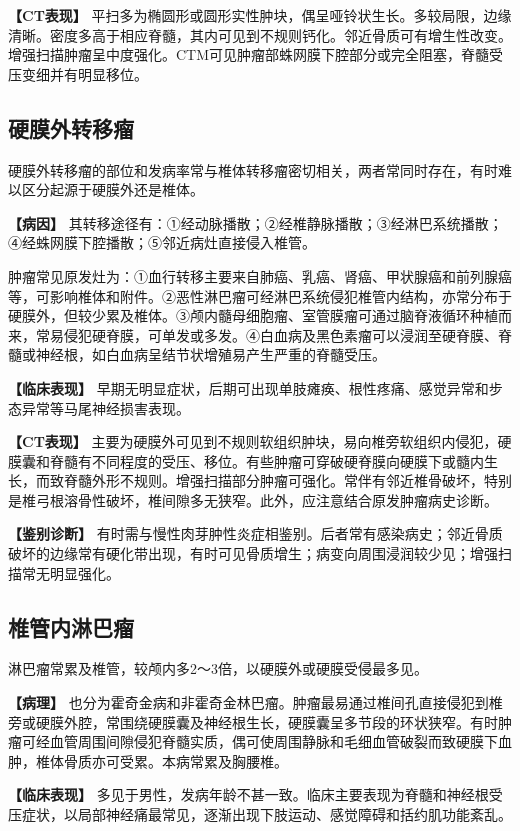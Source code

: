 \textbf{【CT表现】}
平扫多为椭圆形或圆形实性肿块，偶呈哑铃状生长。多较局限，边缘清晰。密度多高于相应脊髓，其内可见到不规则钙化。邻近骨质可有增生性改变。增强扫描肿瘤呈中度强化。CTM可见肿瘤部蛛网膜下腔部分或完全阻塞，脊髓受压变细并有明显移位。

\subsection{硬膜外转移瘤}

硬膜外转移瘤的部位和发病率常与椎体转移瘤密切相关，两者常同时存在，有时难以区分起源于硬膜外还是椎体。

\textbf{【病因】}
其转移途径有：①经动脉播散；②经椎静脉播散；③经淋巴系统播散；④经蛛网膜下腔播散；⑤邻近病灶直接侵入椎管。

肿瘤常见原发灶为：①血行转移主要来自肺癌、乳癌、肾癌、甲状腺癌和前列腺癌等，可影响椎体和附件。②恶性淋巴瘤可经淋巴系统侵犯椎管内结构，亦常分布于硬膜外，但较少累及椎体。③颅内髓母细胞瘤、室管膜瘤可通过脑脊液循环种植而来，常易侵犯硬脊膜，可单发或多发。④白血病及黑色素瘤可以浸润至硬脊膜、脊髓或神经根，如白血病呈结节状增殖易产生严重的脊髓受压。

\textbf{【临床表现】}
早期无明显症状，后期可出现单肢瘫痪、根性疼痛、感觉异常和步态异常等马尾神经损害表现。

\textbf{【CT表现】}
主要为硬膜外可见到不规则软组织肿块，易向椎旁软组织内侵犯，硬膜囊和脊髓有不同程度的受压、移位。有些肿瘤可穿破硬脊膜向硬膜下或髓内生长，而致脊髓外形不规则。增强扫描部分肿瘤可强化。常伴有邻近椎骨破坏，特别是椎弓根溶骨性破坏，椎间隙多无狭窄。此外，应注意结合原发肿瘤病史诊断。

\textbf{【鉴别诊断】}
有时需与慢性肉芽肿性炎症相鉴别。后者常有感染病史；邻近骨质破坏的边缘常有硬化带出现，有时可见骨质增生；病变向周围浸润较少见；增强扫描常无明显强化。

\subsection{椎管内淋巴瘤}

淋巴瘤常累及椎管，较颅内多2～3倍，以硬膜外或硬膜受侵最多见。

\textbf{【病理】}
也分为霍奇金病和非霍奇金林巴瘤。肿瘤最易通过椎间孔直接侵犯到椎旁或硬膜外腔，常围绕硬膜囊及神经根生长，硬膜囊呈多节段的环状狭窄。有时肿瘤可经血管周围间隙侵犯脊髓实质，偶可使周围静脉和毛细血管破裂而致硬膜下血肿，椎体骨质亦可受累。本病常累及胸腰椎。

\textbf{【临床表现】}
多见于男性，发病年龄不甚一致。临床主要表现为脊髓和神经根受压症状，以局部神经痛最常见，逐渐出现下肢运动、感觉障碍和括约肌功能紊乱。

